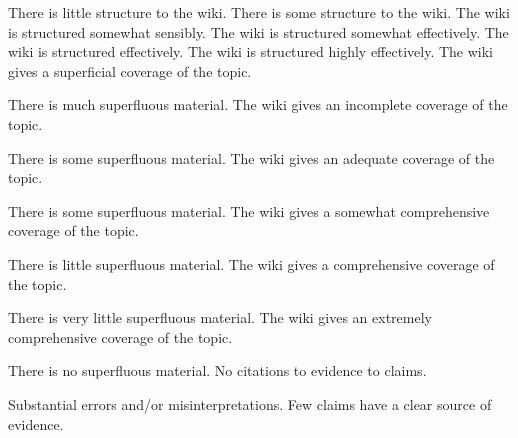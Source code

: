 \documentclass{../../fal_assignment}
\begin{document}
\rubricyearthree
\begin{markingrubric}
%
        \grade\fail 	There is little structure to the wiki.
        \grade 		There is some structure to the wiki.
        \grade 		The wiki is structured somewhat sensibly.
        \grade 		The wiki is structured somewhat effectively.
        \grade 		The wiki is structured effectively.
        \grade 		The wiki is structured highly effectively.
%
        \grade\fail		The wiki gives a superficial coverage of the topic.
				\par			There is much superfluous material.
        \grade 		The wiki gives an incomplete coverage of the topic.
				\par			There is some superfluous material.
        \grade 		The wiki gives an adequate coverage of the topic.
				\par			There is some superfluous material.
        \grade 		The wiki gives a somewhat comprehensive coverage of the topic.
				\par			There is little superfluous material.
        \grade 		The wiki gives a comprehensive coverage of the topic.
				\par			There is very little superfluous material.
        \grade 		The wiki gives an extremely comprehensive coverage of the topic.
				\par			There is no superfluous material.
%
        \grade\fail 	No citations to evidence to claims.
        \par 		Substantial errors and/or misinterpretations.
        \grade 		Few claims have a clear source of evidence.

\end{markingrubric}
\end{document}
